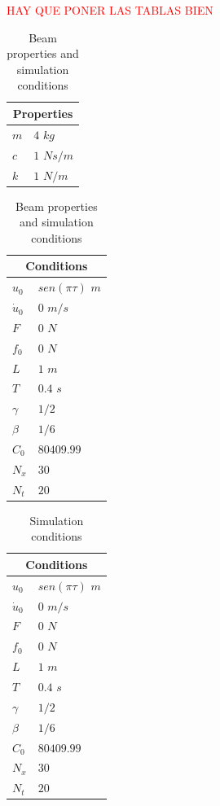 \documentclass[a4paper, 10pt]{article}
\begin{document}
\textcolor{Red}{HAY QUE PONER LAS TABLAS BIEN}

\begin{table}[htb]
\centering
\caption{Beam properties and simulation conditions}
\label{tabla:propiedadesD}
\begin{tabular}{|l|l|}
\hline
\multicolumn{2}{|c|}{Properties} \\ \hline
$m$ & $4$ $kg$ \\
$c$ & $1$ $N s/m$\\
$k$ & $1$ $N/m$\\
\hline
\end{tabular}
\begin{tabular}{|l|l|}
\hline
\multicolumn{2}{|c|}{Conditions} \\ \hline
$u_0$ &  $sen(\pi \tau)$ $m$ \\
$\dot{u}_0$ & $0$ $m/s$\\
$F$ & $0$ $N$\\
$f_0$ & $0$ $N$\\
$L$ & $1$ $m$\\
$T$ & $0.4$ $s$\\
$\gamma$ & $1/2$\\
$\beta$ & $1/6$ \\
$C_0$ & $80409.99$ \\
$N_x$ & $30$ \\
$N_t$ & $20$ \\
\hline
\end{tabular}
\end{table}


\begin{table}[htb]
\centering
\caption{Simulation conditions}
\label{tabla:condicionesD}
\begin{tabular}{|l|l|}
\hline
\multicolumn{2}{|c|}{Conditions} \\ \hline
$u_0$ &  $sen(\pi \tau)$ $m$ \\
$\dot{u}_0$ & $0$ $m/s$\\
$F$ & $0$ $N$\\
$f_0$ & $0$ $N$\\
$L$ & $1$ $m$\\
$T$ & $0.4$ $s$\\
$\gamma$ & $1/2$\\
$\beta$ & $1/6$ \\
$C_0$ & $80409.99$ \\
$N_x$ & $30$ \\
$N_t$ & $20$ \\
\hline
\end{tabular}
\end{table}
\end{document}
